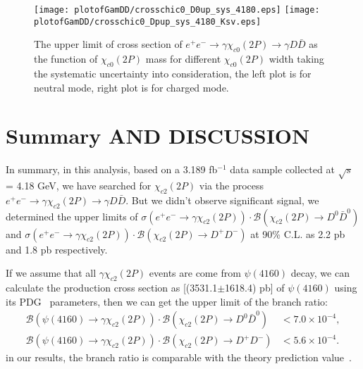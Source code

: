 \documentclass[aps,preprint,tightenlines,superscriptaddress,showpacs,byrevtex,amsmath,amssymb,nofloatfix]{revtex4}
\begin{document}

\begin{figure}[!htbp]
\captionsetup{justification=raggedright}

    \texttt{[image: plotofGamDD/crosschic0\_D0up\_sys\_4180.eps]}
    \texttt{[image: plotofGamDD/crosschic0\_Dpup\_sys\_4180\_Ksv.eps]}

  \caption{\small The upper limit of cross section of $e^{+}e^{-}\rightarrow \gamma \chi_{c0} (2P)\rightarrow \gamma D\bar{D}$ as the function of $\chi_{c0} (2P)$ mass for different $\chi_{c0} (2P)$ width taking the systematic uncertainty into consideration, the left plot is for neutral mode, right plot is for charged mode.}
  \label{crosschic0_up_sys}
\end{figure}



\section{Summary AND DISCUSSION}

In summary, in this analysis, based on a 3.189 fb$^{-1}$ data sample collected at $\sqrt{s}$ = 4.18 GeV, we have searched for $\chi_{c2} (2P)$ via the process $e^{+}e^{-}\rightarrow \gamma \chi_{c2} (2P)\rightarrow \gamma D\bar{D}$. But we didn't observe significant signal, we determined  the upper limits of $\sigma(e^{+}e^{-}\rightarrow \gamma \chi_{c2} (2P)) \cdot \mathcal{B}(\chi_{c2} (2P)\rightarrow  D^{0}\bar{D}^{0})$ and  $\sigma(e^{+}e^{-}\rightarrow \gamma \chi_{c2} (2P)) \cdot \mathcal{B}(\chi_{c2} (2P)\rightarrow  D^{+}D^{-})$  at 90\% C.L. as  2.2 pb and 1.8 pb respectively.

If we assume that all $\gamma \chi_{c2} (2P)$ events are come from $\psi(4160)$ decay, we can calculate the production cross section as [(3531.1$\pm$1618.4) pb] of $\psi(4160)$ using its PDG~\cite{PDG} parameters, then we can get the upper limit of the branch ratio:
\begin{equation}
\begin{aligned}
  \mathcal{B}(\psi(4160)\rightarrow \gamma \chi_{c2} (2P))\cdot \mathcal{B}(\chi_{c2} (2P) \rightarrow D^{0}\bar{D}^{0}) &<  7.0 \times 10^{-4}, \\
%
   \mathcal{B}(\psi(4160)\rightarrow \gamma \chi_{c2} (2P))\cdot \mathcal{B}(\chi_{c2} (2P) \rightarrow D^{+}D^{-}) &<  5.6 \times 10^{-4}.
\end{aligned}
\end{equation}
in our results, the branch ratio is comparable with the theory prediction value~\cite{chicj2p_th1}.
\end{document}
